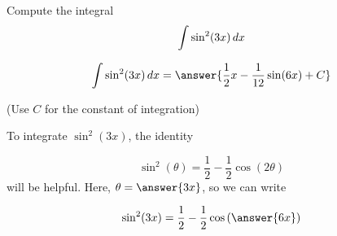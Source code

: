 \documentclass{ximera}
\author{Jason Miller}
\begin{document}
\begin{exercise}
Compute the integral
\[
\int \sin^2 (3x)  \mathop{}\!d x 
\]


\[
\int \sin^2(3x) \d x=\answer{\frac{1}{2}x-\frac{1}{12}\sin(6x) +C}
\]

(Use $C$ for the constant of integration)

\begin{hint}
To integrate $\sin^2(3x)$, the identity

\[
\sin^2(\theta) = \frac{1}{2}-\frac{1}{2} \cos(2\theta)
\]
will be helpful.  Here, $\theta = \answer{3x}$, so we can write

\[
\sin^2(3x) = \frac{1}{2}-\frac{1}{2} \cos\left(\answer{6x}\right)
\]
\end{hint}
\end{exercise}
\end{document}
